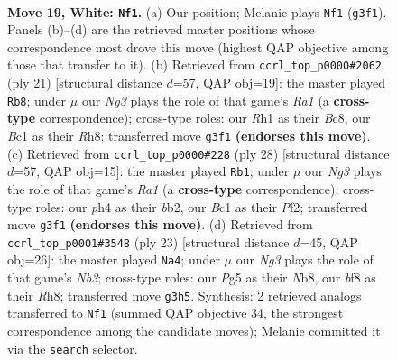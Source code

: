 \documentclass[11pt]{article}
\begin{document}
\clearpage

\begin{figure}[p]\centering
\begin{subfigure}{0.46\textwidth}\centering
\resizebox{\linewidth}{!}{%
\newchessgame
\chessboard[
  setfen={r1b1kb1r/5p2/4p3/pp1pn1P1/7p/6N1/PP4PP/R1BK2NR w kq - 0 19},
  showmover=false,
  pgfstyle=straightmove, color=movearrow, markmove={g3-f1}
]}
\caption{}
\end{subfigure}\hfill
\begin{subfigure}{0.46\textwidth}\centering
\resizebox{\linewidth}{!}{%
\newchessgame
\chessboard[
  setfen={r1bk3r/p3bppp/2B1pn2/4p3/8/2N3P1/PPP2P1P/R1B1K2R b KQ - 0 11},
  showmover=false,
  pgfstyle=straightmove, color=movearrow, markmove={a8-b8}
]}
\caption{}
\end{subfigure}
\\[4pt]
\begin{subfigure}{0.46\textwidth}\centering
\resizebox{\linewidth}{!}{%
\newchessgame
\chessboard[
  setfen={r1br2k1/pp3pp1/7p/nNPp4/8/4PN2/Pb2BPPP/R3K2R w KQ - 0 15},
  showmover=false,
  pgfstyle=straightmove, color=movearrow, markmove={a1-b1}
]}
\caption{}
\end{subfigure}\hfill
\begin{subfigure}{0.46\textwidth}\centering
\resizebox{\linewidth}{!}{%
\newchessgame
\chessboard[
  setfen={rnb1k2r/pp3ppp/1n2p3/2P5/4P3/P4P2/3B2PP/1R2KBNR b Kkq - 0 12},
  showmover=false,
  pgfstyle=straightmove, color=movearrow, markmove={b6-a4}
]}
\caption{}
\end{subfigure}
\caption{\textbf{Move 19, White: \texttt{Nf1}.} (a) Our position; Melanie plays \texttt{Nf1} (\texttt{g3f1}). Panels (b)--(d) are the retrieved master positions whose correspondence most drove this move (highest QAP objective among those that transfer to it). (b) Retrieved from \texttt{ccrl\_top\_p0000\#2062} (ply 21) [structural distance $d$=57, QAP obj=19]: the master played \texttt{Rb8}; under $\mu$ our \emph{Ng3} plays the role of that game's \emph{Ra1} (a \textbf{cross-type} correspondence); cross-type roles: our \emph{R}h1 as their \emph{B}c8, our \emph{B}c1 as their \emph{R}h8; transferred move \texttt{g3f1} \textbf{(endorses this move)}. (c) Retrieved from \texttt{ccrl\_top\_p0000\#228} (ply 28) [structural distance $d$=57, QAP obj=15]: the master played \texttt{Rb1}; under $\mu$ our \emph{Ng3} plays the role of that game's \emph{Ra1} (a \textbf{cross-type} correspondence); cross-type roles: our \emph{p}h4 as their \emph{b}b2, our \emph{B}c1 as their \emph{P}f2; transferred move \texttt{g3f1} \textbf{(endorses this move)}. (d) Retrieved from \texttt{ccrl\_top\_p0001\#3548} (ply 23) [structural distance $d$=45, QAP obj=26]: the master played \texttt{Na4}; under $\mu$ our \emph{Ng3} plays the role of that game's \emph{Nb3}; cross-type roles: our \emph{P}g5 as their \emph{N}b8, our \emph{b}f8 as their \emph{R}h8; transferred move \texttt{g3h5}. Synthesis: 2 retrieved analogs transferred to \texttt{Nf1} (summed QAP objective 34, the strongest correspondence among the candidate moves); Melanie committed it via the \texttt{search} selector.}
\label{fig:thought-m36}
\end{figure}
\end{document}
